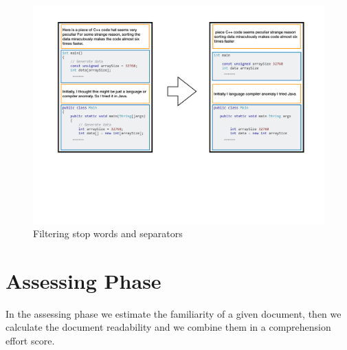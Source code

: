 \documentclass[12pt,mscthesis]{usiinfthesis}
\begin{document}
	\begin{figure}[htbp]
	\centering
	\includegraphics[width=\textwidth]{FilterLM}
	\caption{Filtering stop words and separators}
	\label{FilterLM}
	\end{figure}



	\section{Assessing Phase}

	In the assessing phase we estimate the familiarity of a given document, then we calculate the document readability and we combine them in a comprehension effort score.
\end{document}
